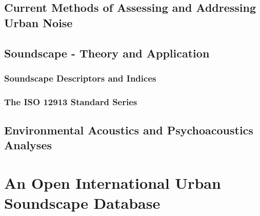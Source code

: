 \documentclass[twoside,fontsize=12pt,titlepage]{scrbook}
\begin{document}
 \section{Current Methods of Assessing and Addressing Urban Noise}
 \section{Soundscape - Theory and Application}
  \subsection{Soundscape Descriptors and Indices}
        \citep{Aletta2016Soundscape}
  
  \subsection{The ISO 12913 Standard Series}
 \section{Environmental Acoustics and Psychoacoustics Analyses}


\chapter{An Open International Urban Soundscape Database}
 
 
 
 
 
 
 
 
 \backmatter
 
 
 
\end{document}
